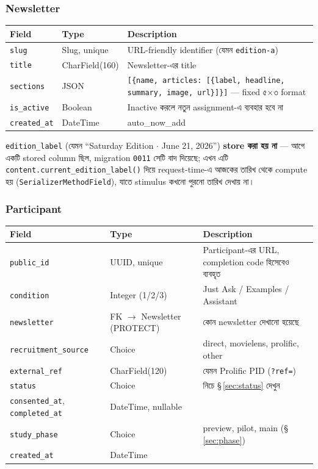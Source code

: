 \documentclass[11pt,a4paper]{article}
\newcommand{\code}[1]{\texttt{\small #1}}
\begin{document}
\subsubsection{Newsletter}
\begin{longtable}{@{}p{3.2cm}p{2.6cm}p{9.8cm}@{}}
\toprule
\textbf{Field} & \textbf{Type} & \textbf{Description} \\
\midrule
\endhead
\code{slug} & Slug, unique & URL-friendly identifier (যেমন \code{edition-a}) \\
\code{title} & CharField(160) & Newsletter-এর title \\
\code{sections} & JSON & \code{[\{name, articles: [\{label, headline, summary, image, url\}]\}]}
  --- fixed ৫$\times$৩ format \\
\code{is\_active} & Boolean & Inactive করলে নতুন assignment-এ ব্যবহার হবে না \\
\code{created\_at} & DateTime & auto\_now\_add \\
\bottomrule
\end{longtable}
\code{edition\_label} (যেমন ``Saturday Edition $\cdot$ June 21, 2026'') \textbf{store করা হয়
না} --- আগে একটি stored column ছিল, migration \code{0011} সেটি বাদ দিয়েছে; এখন এটি
\code{content.current\_edition\_label()} দিয়ে request-time-এ আজকের তারিখ থেকে compute হয়
(\code{SerializerMethodField}), যাতে stimulus কখনো পুরনো তারিখ দেখায় না।

\subsubsection{Participant}
\begin{longtable}{@{}p{4.6cm}p{2.6cm}p{8.2cm}@{}}
\toprule
\textbf{Field} & \textbf{Type} & \textbf{Description} \\
\midrule
\endhead
\code{public\_id} & UUID, unique & Participant-এর URL, completion code হিসেবেও ব্যবহৃত \\
\code{condition} & Integer (1/2/3) & Just Ask / Examples / Assistant \\
\code{newsletter} & FK $\to$ Newsletter (PROTECT) & কোন newsletter দেখানো হয়েছে \\
\code{recruitment\_source} & Choice & direct, movielens, prolific, other \\
\code{external\_ref} & CharField(120) & যেমন Prolific PID (\code{?ref=}) \\
\code{status} & Choice & নিচে \S\,\ref{sec:status} দেখুন \\
\code{consented\_at}, \code{completed\_at} & DateTime, nullable & \\
\code{study\_phase} & Choice & preview, pilot, main (\S\,\ref{sec:phase}) \\
\code{created\_at} & DateTime & \\
\bottomrule
\end{longtable}
\end{document}
